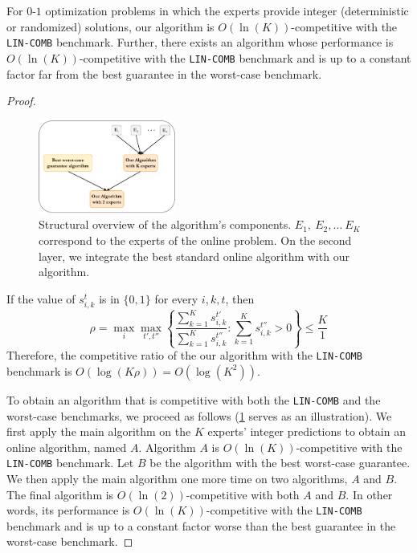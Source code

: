 \begin{corollary} \label{corollary}
	For $0$-$1$ optimization problems in which the experts provide integer (deterministic or randomized) solutions,
	our algorithm is $O(\ln (K))$-competitive with the \texttt{LIN-COMB} benchmark.
	Further, there exists an algorithm whose performance is $O(\ln (K))$-competitive with the \texttt{LIN-COMB}
	benchmark and is up to a constant factor far from the best guarantee in the worst-case benchmark.
\end{corollary}
%
\begin{proof}

	\begin{figure}[!ht]
		\centering
		\includegraphics[width=0.4\textwidth]{../paper/Img/algo_structure.pdf}
		\caption{Structural overview of the algorithm's components. $E_1,\ E_2, \dots\ E_K$ correspond to the experts of the online problem. On the second layer, we integrate the best standard online algorithm with our algorithm. }
		\label{fig:algo-layers}
	\end{figure}

	\noindent If the value of $s_{i,k}^{t}$ is in $\{0,1\}$ for every $i,k,t$, then
	\[
	\rho = \max_{i} \max_{t',t''} \left\{\frac{\sum_{k=1}^{K} s_{i,k}^{t'}}{\sum_{k=1}^{K} s_{i,k}^{t''}} : \sum_{k=1}^{K} s_{i,k}^{t''} > 0 \right\}
	\leq \frac{K}{1}
	\]
	Therefore, the competitive ratio of the our algorithm with the \texttt{LIN-COMB} benchmark is $O(\log (K \rho)) = O(\log (K^2))$.

 	To obtain an algorithm that is competitive with both the \texttt{LIN-COMB} and the worst-case benchmarks, we proceed as follows (\cref{fig:algo-layers} serves as an illustration).
	We first apply the main algorithm on the $K$ experts' integer predictions to obtain an online algorithm, named $A$.
	Algorithm $A$ is $O(\ln (K))$-competitive with the \texttt{LIN-COMB} benchmark. Let $B$ be the algorithm with the best worst-case guarantee.
	We then apply the main algorithm one more time on two algorithms, $A$ and $B$. The final algorithm is $O(\ln (2))$-competitive with both $A$ and $B$.
	In other words, its performance is $O(\ln (K))$-competitive with the \texttt{LIN-COMB} benchmark and is up to a constant factor worse than the best guarantee in the worst-case benchmark.
\end{proof}

